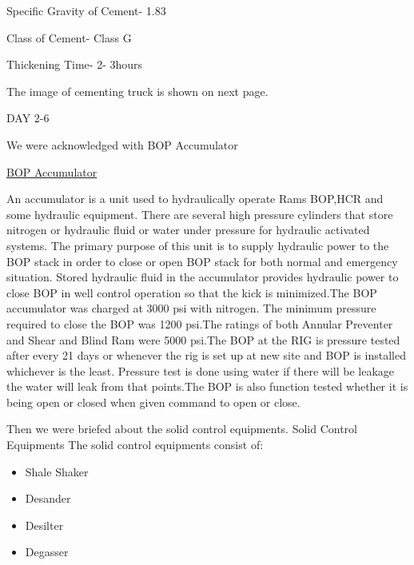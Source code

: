 \documentclass[11pt,a4paper]{article}
\begin{document}
Specific Gravity of Cement- 1.83

Class of Cement- Class G

Thickening Time- 2- 3hours

The image of cementing truck is shown on next page.

DAY 2-6

We were acknowledged with BOP Accumulator


\underline{BOP Accumulator}

An accumulator is a unit used to hydraulically operate Rams BOP,HCR and some hydraulic equipment. There are several high pressure cylinders that store nitrogen or hydraulic fluid or water under pressure for hydraulic activated systems. The primary purpose of this unit is to supply hydraulic power to the BOP stack in order to close or open BOP stack for both normal and emergency situation. Stored hydraulic fluid in the accumulator provides hydraulic power to close BOP in well control operation so that the kick is minimized.The BOP accumulator was charged at 3000 psi with nitrogen. The minimum pressure required to close the BOP was 1200 psi.The ratings of both Annular Preventer and Shear and Blind Ram were 5000 psi.The BOP at the RIG is pressure tested after every 21 days or whenever the rig is set up at new site and BOP is installed whichever is the least. Pressure test is done using water if there will be leakage the water will leak from that points.The BOP is also function tested whether it is being open or closed when given command to open or close.

\noindent Then we were briefed about the solid control equipments.
Solid Control Equipments
The solid control equipments consist of:

\begin{itemize}

\item Shale Shaker
\item Desander
\item Desilter
\item Degasser

\end{itemize}

 
\end{document}
